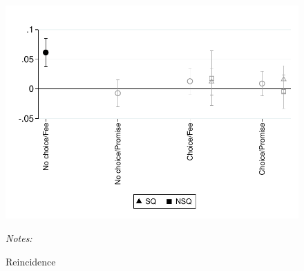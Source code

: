 \documentclass[11pt]{article}
\begin{document}
\begin{figure}[H]
        \caption{Reincidence}
    \label{micas}
    \begin{center}
        \centering
        \includegraphics[width=\textwidth]{Figuras/te_graph_reincidence.pdf}
    \end{center}
     \footnotesize \textit{Notes: } 
      \footnotesize{ }
\end{figure}
\end{document}

